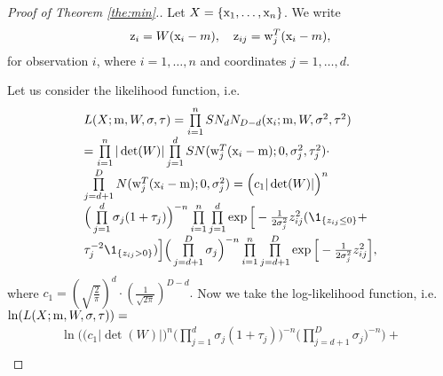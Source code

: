 \begin{proof}[Proof of Theorem \ref{the:min}.]
Let $X=\{ \mathrm{x}_1, \ldots, \mathrm{x}_n \}$.
We write 
\begin{equation*}
\mathrm{z}_i= W(\mathrm{x}_i-m), \quad \mathrm{z}_{ij}= \mathrm{w}_j^T(\mathrm{x}_i-m),
\end{equation*}
for observation $i$, where $i=1,\ldots,n$ and coordinates $j=1,\ldots,d$.

Let us consider the likelihood function, i.e. 
$$
\begin{array}{l}
L(X;\m,W,\sigma,\tau) = \prod\limits_{i=1}^{n} SN_{d}N_{D-d}(\x_i; \m,W, \sigma^2,\tau^2) \\[6pt] 
=\prod\limits_{i=1}^{n} | \det(W)|  \prod\limits_{j=1}^{d} SN(  \w_j^T (\x_i - \m) ; 0 , \sigma_j^2, \tau_j^2) \cdot \\[6pt]
\prod\limits_{j=d+1}^{D} N(  \w_j^T (\x_i - \m) ; 0 , \sigma_j^2) =\Big( c_1|\det(W)| \Big)^{n} \\[6pt]
\Big( \prod\limits_{j=1}^{d} \sigma_j(1+\tau_j) \Big)^{-n} %
\prod\limits_{i=1}^{n} %
\prod\limits_{j=1}^{d} \exp \Big[ -\frac{1}{2\sigma_j^2}z_{ij}^2 (\1_{ \{ z_{ij} \leq 0 \} } + \\[6pt]
\tau_{j}^{-2} \1_{ \{ z_{ij} > 0 \} }) \Big] \Big( \prod\limits_{j=d+1}^{D} \sigma_j \Big)^{-n} \prod\limits_{i=1}^{n}\prod\limits_{j=d+1}^{D} \exp \Big[ -\frac{1}{2\sigma_j^2}z_{ij}^2 \Big],
\end{array}
$$
where 
$
c_1= \left( \sqrt{\tfrac{2}{\pi}} \right)^{d} \cdot \left( \tfrac{1}{ \sqrt{2\pi} } \right)^{D-d}.
$
Now we take the log-likelihood function, i.e. $\ln(L(X;\m,W,\sigma,\tau)) =$
$$
\begin{array}{l}
\ln \bigg( \Big( c_1|\det(W)| \Big)^{n} \Big( \prod\limits_{j=1}^{d} \sigma_j(1+\tau_j) \Big)^{-n} \Big( \prod\limits_{j=d+1}^{D} \sigma_j \Big)^{-n}  \bigg) + \\[6pt]

\end{array}$$
\end{proof}

